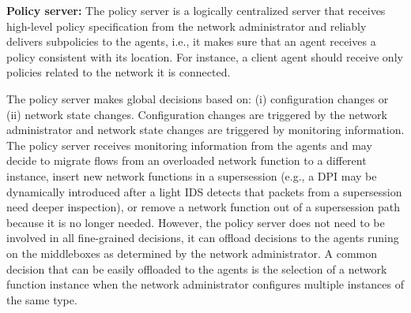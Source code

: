 




{\bf Policy  server:}   The  \system  policy  server is   a  logically
centralized server that receives  high-level policy specification from
the  network  administrator and reliably   delivers subpolicies to the
agents, i.e., it makes sure that an agent receives a policy consistent
with its location.  For instance,  a client agent should receive  only
policies related to the network it is connected.

The  policy server makes  global decisions based on: (i) configuration
changes  or (ii)   network state changes.    Configuration changes are
triggered  by the network administrator and  network state changes are
triggered  by monitoring   information.  The  policy  server  receives
monitoring  information  from the \system   agents and  may  decide to
migrate flows   from an overloaded   network function to   a different
instance, insert new network functions  in a supersession (e.g., a DPI
may be dynamically introduced after  a light IDS detects that  packets
from  a  supersession  need deeper  inspection), or   remove a network
function  out of a  supersession path because it  is no longer needed.
However, the   policy  server does  not need  to  be  involved  in all
fine-grained decisions, it can offload decisions to the \system agents
runing on the middleboxes as determined  by the network administrator.
A common decision that  can be easily offloaded to  the agents is  the
selection   of a     network   function instance   when  the   network
administrator configures multiple instances of the same type.

